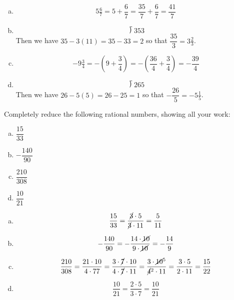 \documentclass[11pt,letterpaper]{article}
\begin{document}
\sol
\begin{enumerate}[(a)]
\item 
	\[
	5 \tfrac{6}{7}= 5 + \dfrac{6}{7}= \dfrac{35}{7} + \dfrac{6}{7}= \dfrac{41}{7}
	\] \pspace

\item 
	\[
	\longdivision{35}{3}
	\] 
Then we have $35 - 3(11)= 35 - 33= 2$ so that $\dfrac{35}{3}= 3 \tfrac{2}{3}$. \pspace

\item 
	\[
	-9 \tfrac{3}{4}= -\left( 9 + \dfrac{3}{4} \right)= -\left( \dfrac{36}{4} + \dfrac{3}{4} \right)= -\dfrac{39}{4}
	\] \pspace

\item 
	\[
	\longdivision{26}{5}
	\] 
Then we have $26 - 5(5)= 26 - 25= 1$ so that $-\dfrac{26}{5}= -5 \tfrac{1}{5}$.
\end{enumerate}



\newpage



 Completely reduce the following rational numbers, showing all your work:
	\begin{enumerate}[(a)]
	\item $\dfrac{15}{33}$
	\item $-\dfrac{140}{90}$
	\item $\dfrac{210}{308}$
	\item $\dfrac{10}{21}$
	\end{enumerate} \pspace

\sol
\begin{enumerate}[(a)]
\item 
	\[
	\dfrac{15}{33}= \dfrac{\cancel{3} \cdot 5}{\cancel{3} \cdot 11}= \dfrac{5}{11}
	\] \pspace

\item 
	\[
	-\dfrac{140}{90}= -\dfrac{14 \cdot \cancel{10}}{9 \cdot \cancel{10}}= -\dfrac{14}{9}
	\] \pspace

\item 
	\[
	\dfrac{210}{308}= \dfrac{21 \cdot 10}{4 \cdot 77}= \dfrac{3 \cdot \cancel{7} \cdot 10}{4 \cdot \cancel{7} \cdot 11}= \dfrac{3 \cdot \cancel{10}^5}{\cancel{4}^2 \cdot 11}= \dfrac{3 \cdot 5}{2 \cdot 11}= \dfrac{15}{22}
	\] \pspace

\item 
	\[
	\dfrac{10}{21}= \dfrac{2 \cdot 5}{3 \cdot 7}= \dfrac{10}{21}
	\] 
\end{enumerate}
\end{document}

